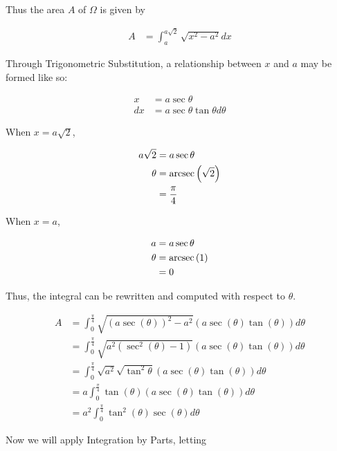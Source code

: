 \documentclass{article}
\begin{document}
    Thus the area $A$ of $\Omega$ is given by

    \begin{align*}
        A   &= \int_a^{a\sqrt{2}} \sqrt{x^2-a^2}dx
    \end{align*}

    Through Trigonometric Substitution, a relationship between $x$ and $a$ may be formed like so:

    \begin{align*}
        x   &= a\sec{\theta} \\
        dx  &= a\sec{\theta}\tan{\theta}d\theta
    \end{align*}

    When $x=a\sqrt{2}$,

    \begin{align*}
        a\sqrt{2}   &= a\sec{\theta} \\
        \theta      &= \operatorname{arcsec}{\left(\sqrt{2}\right)} \\
                    &= \frac{\pi}{4}
    \end{align*}

    When $x=a$,

    \begin{align*}
        a       &= a\sec{\theta} \\
        \theta  &= \operatorname{arcsec}{(1)} \\
                &= 0
    \end{align*}

    Thus, the integral can be rewritten and computed with respect to $\theta$.

    \begin{align*}
        A   &= \int_0^{\frac{\pi}{4}} \sqrt{\left(a\sec{(\theta)}\right)^2-a^2}\left(a\sec{(\theta)}\tan{(\theta)}\right)d\theta \\
            &= \int_0^{\frac{\pi}{4}} \sqrt{a^2\left(\sec^2{(\theta)}-1\right)} \left(a\sec{(\theta)}\tan{(\theta)}\right)d\theta \\
            &= \int_0^{\frac{\pi}{4}} \sqrt{a^2}\sqrt{\tan^2{\theta}}  \left(a\sec{(\theta)}\tan{(\theta)}\right)d\theta \\
            &= a \int_0^{\frac{\pi}{4}} \tan{(\theta)} \left(a\sec{(\theta)}\tan{(\theta)}\right)d\theta \\
            &= a^2\int_0^{\frac{\pi}{4}} \tan^2{(\theta)} \sec{(\theta)}d\theta
    \end{align*}

    Now we will apply Integration by Parts, letting
\end{document}
